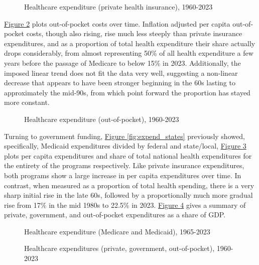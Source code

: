 \documentclass[11pt]{article}
\begin{document}
\begin{figure}[!ht]
  \sffamily
  \caption{Healthcare expenditure (private health insurance), 1960-2023}
  
  \label{fig:expend_priv}
\end{figure}

\hyperref[fig:expend_oop]{Figure \ref*{fig:expend_oop}} plots out-of-pocket costs over time. Inflation adjusted per capita out-of-pocket costs, though also rising, rise much less steeply than private insurance expenditures, and as a proportion of total health expenditure their share actually drops considerably, from almost representing 50\% of all health expenditure a few years before the passage of Medicare to below 15\% in 2023. Additionally, the imposed linear trend does not fit the data very well, suggesting a non-linear decrease that appears to have been stronger beginning in the 60s lasting to approximately the mid-90s, from which point forward the proportion has stayed more constant.

\begin{figure}[!ht]
  \sffamily
  \caption{Healthcare expenditure (out-of-pocket), 1960-2023}
  
  \label{fig:expend_oop}
\end{figure}

Turning to government funding, \hyperref[fig:expend_states]{Figure \ref*{fig:expend_states}} previously showed, specifically, Medicaid expenditures divided by federal and state/local, \hyperref[fig:expend_govt]{Figure \ref*{fig:expend_govt}} plots per capita expenditures and share of total national health expenditures for the entirety of the programs respectively. Like private insurance expenditures, both programs show a large increase in per capita expenditures over time. In contrast, when measured as a proportion of total health spending, there is a very sharp initial rise in the late 60s, followed by a proportionally much more gradual rise from 17\% in the mid 1980s to 22.5\% in 2023. \hyperref[fig:expend_all]{Figure \ref*{fig:expend_all}} gives a summary of private, government, and out-of-pocket expenditures as a share of GDP.

\begin{figure}[!ht]
  \sffamily
  \caption{Healthcare expenditure (Medicare and Medicaid), 1965-2023}
  
  \label{fig:expend_govt}
\end{figure}

\begin{figure}[!ht]
  \sffamily
  \caption{Healthcare expenditures (private, government, out-of-pocket), 1960-2023}
  
  \label{fig:expend_all}
\end{figure}
\end{document}
